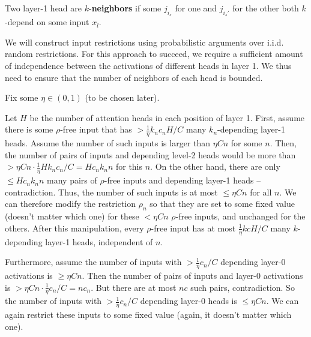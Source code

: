 \documentclass[11pt,a4paper]{article}
\begin{document}
Two layer-1 head are $k$-\textbf{neighbors} if some $j_{i_s}$ for one and $j_{i_s'}$ for the other both $k$-depend on some input $x_l$.



We will construct input restrictions using probabilistic arguments over i.i.d. random restrictions.
For this approach to succeed, we require a  sufficient amount of independence between the activations of different heads in layer 1.
We thus need to ensure that the number of neighbors of each head is bounded.

Fix some $\eta \in (0,1)$ (to be chosen later).

Let $H$ be the number of attention heads in each position of layer 1.
First, assume there is some $\rho$-free input that has $>\frac{1}{\eta}k_nc_nH/C$ many $k_n$-depending layer-1 heads.
Assume the number of such inputs is larger than $\eta Cn$ for some $n$.
Then, the number of pairs of inputs and depending level-2 heads would be more than $> \eta C n \cdot \frac{1}{\eta} H k_n c_n/C = Hc_nk_nn$ for this $n$.
On the other hand, there are only $\leq Hc_nk_nn$ many pairs of $\rho$-free inputs and depending layer-1 heads -- contradiction.
Thus, the number of such inputs is at most $\leq \eta Cn$ for all $n$.
We can therefore modify the restriction $\rho_n$ so that they are set to some fixed value (doesn't matter which one) for these $<\eta Cn$ $\rho$-free inputs, and unchanged for the others.
After this manipulation, every $\rho$-free input has at most $\frac{1}{\eta}kcH/C$ many $k$-depending layer-1 heads, independent of $n$.

Furthermore, assume the number of inputs with $> \frac{1}{\eta} c_n/C$ depending layer-0 activations is $\geq \eta Cn$.
Then the number of pairs of inputs and layer-0 activations is $>\eta Cn \cdot \frac{1}{\eta} c_n/C = nc_n$.
But there are at most $nc$ such pairs, contradiction.
So the number of inputs with $> \frac{1}{\eta} c_n/C$ depending layer-0 heads is $\leq \eta Cn$.
We can again restrict these inputs to some fixed value (again, it doesn't matter which one).
\end{document}
